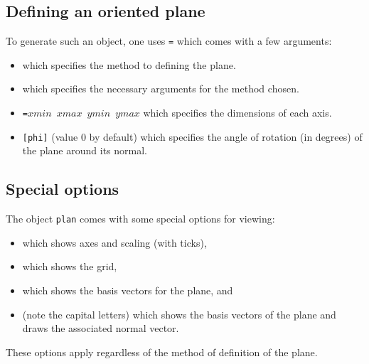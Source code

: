 \subsection{Defining an oriented plane}

To generate such an object, one uses \texttt{=} which comes with a few arguments:

\begin{itemize}

\item {} which specifies the method to defining the plane.

\item {} which specifies the necessary arguments for the method chosen.

\item \texttt{=$xmin$ $xmax$ $ymin$ $ymax$} which specifies the dimensions of each axis.

\item \verb+[phi]+ (value $0$ by default) which specifies the angle of rotation (in degrees) of the plane around its normal.



\end{itemize}

\subsection{Special options}

The object \verb+plan+ comes with some special options for  viewing:
\begin{itemize}
\item {} which shows axes and scaling (with ticks),
\item {} which shows the grid,
\item {} which shows the basis vectors for the plane, and
\item {} (note the capital letters) which shows the basis vectors of the plane
and draws the associated normal vector.
\end{itemize}
These options apply regardless of the method of definition of the plane.

